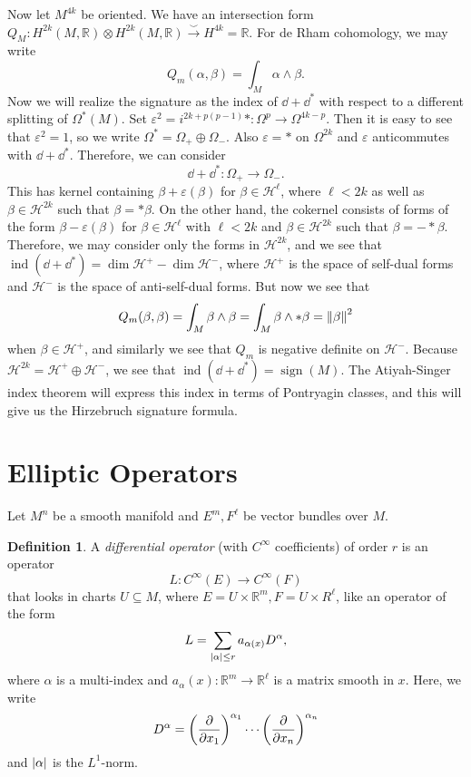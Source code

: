 \documentclass[leqno, openany]{memoir}
\theoremstyle{definition}
\newtheorem{defn}[thm]{Definition}
\theoremstyle{remark}
\theoremstyle{plain}
\theoremstyle{definition}
\theoremstyle{remark}
\newcommand{\R}{\mathbb{R}}
\newcommand{\ep}{\varepsilon}
\newcommand{\mc}[1]{\mathcal{#1}}
\DeclareMathOperator{\sign}{sign}
\DeclareMathOperator{\ind}{ind}
\begin{document}
Now let $M^{4k}$ be oriented. We have an intersection form $Q_M \colon H^{2k}(M, \R) \otimes H^{2k}(M, \R) \xrightarrow{\smile} H^{4k} = \R$. For de Rham cohomology, we may write
\[ Q_m(\alpha, \beta) = \int_M \alpha \wedge \beta. \]
Now we will realize the signature as the index of $\dd + \dd^*$ with respect to a different splitting of $\Omega^*(M)$. Set $\ep^2 = i^{2k + p(p-1)} * \colon \Omega^p \to \Omega^{4k-p}$. Then it is easy to see that $\ep^2 = 1$, so we write $\Omega^* = \Omega_+ \oplus \Omega_-$. Also $\ep = *$ on $\Omega^{2k}$ and $\ep$ anticommutes with $\dd + \dd^*$. Therefore, we can consider
\[ \dd + \dd^* \colon \Omega_+ \to \Omega_-. \]
This has kernel containing $\beta + \ep(\beta)$ for $\beta \in \mc{H}^{\ell}$, where $\ell < 2k$ as well as $\beta \in \mc{H}^{2k}$ such that $\beta = *\beta$. On the other hand, the cokernel consists of forms of the form $\beta - \ep(\beta)$ for $\beta\in \mc{H}^{\ell}$ with $\ell < 2k$ and $\beta \in \mc{H}^{2k}$ such that $\beta = - *\beta$. Therefore, we may consider only the forms in $\mc{H}^{2k}$, and we see that $\ind(\dd + \dd^*) = \dim \mc{H}^+ - \dim \mc{H}^-$, where $\mc{H}^+$ is the space of self-dual forms and $\mc{H}^-$ is the space of anti-self-dual forms. But now we see that 
\[ Q_m(\beta, \beta) = \int_M \beta \wedge \beta = \int_M \beta \wedge * \beta = \norm{\beta}^2 \]
when $\beta \in \mc{H}^+$, and similarly we see that $Q_m$ is negative definite on $\mc{H}^-$. Because $\mc{H}^{2k} = \mc{H}^+ \oplus \mc{H}^-$, we see that $\ind(\dd + \dd^*) = \sign(M)$. The Atiyah-Singer index theorem will express this index in terms of Pontryagin classes, and this will give us the Hirzebruch signature formula.

\section{Elliptic Operators}%
\label{sec:elliptic_operators}

Let $M^n$ be a smooth manifold and $E^m, F^{\ell}$ be vector bundles over $M$. 

\begin{defn}
    A \textit{differential operator} (with $C^{\infty}$ coefficients) of order $r$ is an operator
    \[ L \colon C^{\infty}(E) \to C^{\infty}(F) \]
    that looks in charts $U \subseteq M$, where $E = U \times \R^m, F = U \times R^{\ell}$, like an operator of the form
    \[ L = \sum_{\abs{\alpha} \leq r} a_{\alpha(x)} D^{\alpha}, \]
    where $\alpha$ is a multi-index and $a_{\alpha}(x) \colon \R^m \to \R^{\ell}$ is a matrix smooth in $x$. Here, we write
    \[ D^{\alpha} = {\qty(\pdv{x_1})}^{\alpha_1} \cdots {\qty(\pdv{x_n})}^{\alpha_n} \]
    and $\abs{\alpha}$ is the $L^1$-norm. 
\end{defn}
\end{document}
